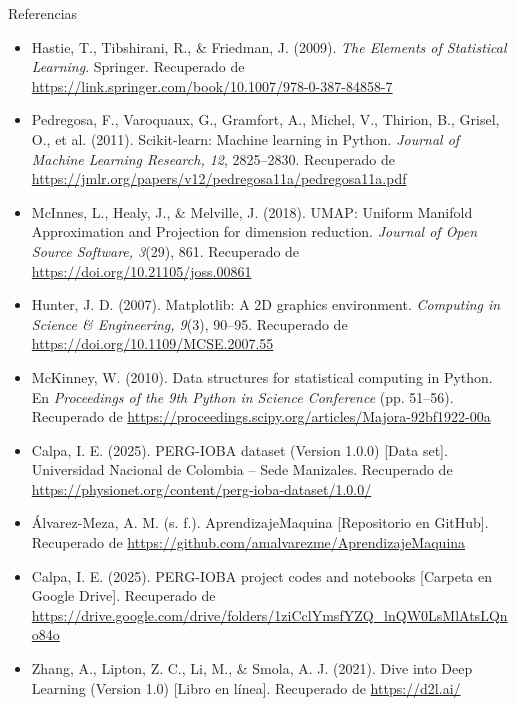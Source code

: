 \documentclass{beamer}
\begin{document}
\begin{frame}[allowframebreaks]{Referencias}
\begin{itemize}
  \item Hastie, T., Tibshirani, R., \& Friedman, J. (2009). \emph{The Elements of Statistical Learning}. Springer. Recuperado de \url{https://link.springer.com/book/10.1007/978-0-387-84858-7}

  \item Pedregosa, F., Varoquaux, G., Gramfort, A., Michel, V., Thirion, B., Grisel, O., et al. (2011). Scikit-learn: Machine learning in Python. \emph{Journal of Machine Learning Research, 12}, 2825–2830. Recuperado de \url{https://jmlr.org/papers/v12/pedregosa11a/pedregosa11a.pdf}

  \item McInnes, L., Healy, J., \& Melville, J. (2018). UMAP: Uniform Manifold Approximation and Projection for dimension reduction. \emph{Journal of Open Source Software, 3}(29), 861. Recuperado de \url{https://doi.org/10.21105/joss.00861}

  \item Hunter, J. D. (2007). Matplotlib: A 2D graphics environment. \emph{Computing in Science \& Engineering, 9}(3), 90–95. Recuperado de \url{https://doi.org/10.1109/MCSE.2007.55}

  \item McKinney, W. (2010). Data structures for statistical computing in Python. En \emph{Proceedings of the 9th Python in Science Conference} (pp. 51–56). Recuperado de \url{https://proceedings.scipy.org/articles/Majora-92bf1922-00a}

  \item Calpa, I. E. (2025). PERG-IOBA dataset (Version 1.0.0) [Data set]. Universidad Nacional de Colombia – Sede Manizales. Recuperado de \url{https://physionet.org/content/perg-ioba-dataset/1.0.0/}

  \item Álvarez-Meza, A. M. (s. f.). AprendizajeMaquina [Repositorio en GitHub]. Recuperado de \url{https://github.com/amalvarezme/AprendizajeMaquina}

  \item Calpa, I. E. (2025). PERG-IOBA project codes and notebooks [Carpeta en Google Drive]. Recuperado de \url{https://drive.google.com/drive/folders/1ziCclYmsfYZQ_lnQW0LsMlAtsLQno84o}

  \item Zhang, A., Lipton, Z. C., Li, M., \& Smola, A. J. (2021). Dive into Deep Learning (Version 1.0) [Libro en línea]. Recuperado de \url{https://d2l.ai/}
\end{itemize}
\end{frame}
\end{document}
